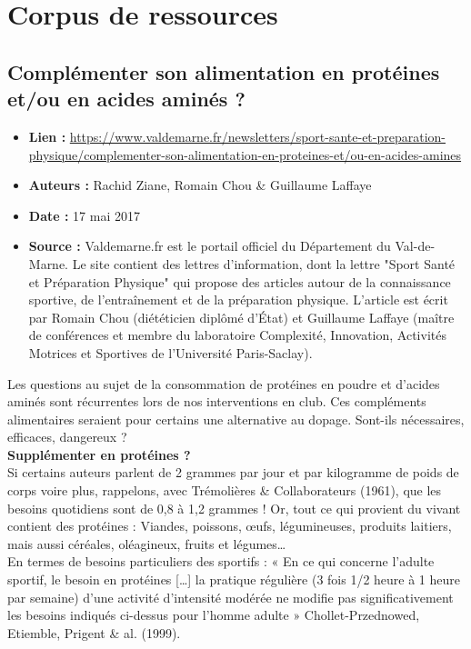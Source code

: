 \documentclass[8pt]{article}
\begin{document}
\newpage
\section{Corpus de ressources}
\subsection{Complémenter son alimentation en protéines et/ou en acides aminés ?}
\begin{itemize}
	\item \textbf{Lien : }  \url{https://www.valdemarne.fr/newsletters/sport-sante-et-preparation-physique/complementer-son-alimentation-en-proteines-et/ou-en-acides-amines} 
	\item \textbf{Auteurs : } Rachid Ziane, Romain Chou  \& Guillaume Laffaye
	\item \textbf{Date : } 17 mai 2017
	\item \textbf{Source : } Valdemarne.fr est le portail officiel du Département du Val-de-Marne. Le site contient des lettres d'information, dont la lettre "Sport Santé et Préparation Physique" qui propose des articles autour de la connaissance sportive, de l'entraînement et de la préparation physique.
	L'article est écrit par Romain Chou (diététicien diplômé d’État) et Guillaume Laffaye (maître de conférences et membre du laboratoire Complexité, Innovation, Activités Motrices et Sportives de l'Université Paris-Saclay).
	
\end{itemize}


Les questions au sujet de la consommation de protéines en poudre et d’acides aminés sont récurrentes lors de nos interventions en club. Ces compléments alimentaires seraient pour certains une alternative au dopage.
Sont-ils nécessaires, efficaces, dangereux ?\\


\textbf{Supplémenter en protéines ?}\\

Si certains auteurs parlent de 2 grammes par jour et par kilogramme de poids de corps voire plus, rappelons, avec Trémolières \& Collaborateurs (1961), que les besoins quotidiens sont de 0,8 à 1,2 grammes ! Or, tout ce qui provient du vivant contient des protéines : Viandes, poissons, œufs, légumineuses, produits laitiers, mais aussi céréales, oléagineux, fruits et légumes…\\

En termes de besoins particuliers des sportifs : « En ce qui concerne l'adulte sportif, le besoin en protéines […] la pratique régulière (3 fois 1/2 heure à 1 heure par semaine) d'une activité d'intensité modérée ne modifie pas significativement les besoins indiqués ci-dessus pour l'homme adulte » Chollet-Przednowed, Etiemble, Prigent \& al. (1999).\\
\end{document}
